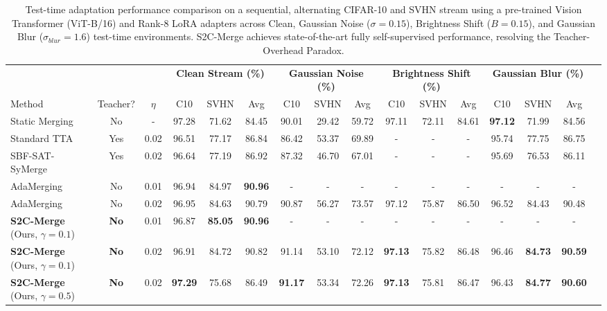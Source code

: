 \documentclass{article}
\theoremstyle{plain}
\theoremstyle{definition}
\theoremstyle{remark}
\begin{document}
\begin{table}[t]
\caption{Test-time adaptation performance comparison on a sequential, alternating CIFAR-10 and SVHN stream using a pre-trained Vision Transformer (ViT-B/16) and Rank-8 LoRA adapters across Clean, Gaussian Noise ($\sigma=0.15$), Brightness Shift ($B=0.15$), and Gaussian Blur ($\sigma_{blur}=1.6$) test-time environments. S2C-Merge achieves state-of-the-art fully self-supervised performance, resolving the Teacher-Overhead Paradox.}
\label{tab:results}
\vskip 0.05in
\centering
\begin{footnotesize}
\begin{sc}
\setlength{\tabcolsep}{1.2pt}
\begin{tabular}{lccccccccccccccc}
\toprule
& & & \multicolumn{3}{c}{\textbf{Clean Stream (\%)}} & \multicolumn{3}{c}{\textbf{Gaussian Noise (\%)}} & \multicolumn{3}{c}{\textbf{Brightness Shift (\%)}} & \multicolumn{3}{c}{\textbf{Gaussian Blur (\%)}} \\
\cmidrule(r){4-6} \cmidrule(r){7-9} \cmidrule(r){10-12} \cmidrule(r){13-15}
Method & Teacher? & $\eta$ & C10 & SVHN & Avg & C10 & SVHN & Avg & C10 & SVHN & Avg & C10 & SVHN & Avg \\
\midrule
Static Merging & No & - & 97.28 & 71.62 & 84.45 & 90.01 & 29.42 & 59.72 & 97.11 & 72.11 & 84.61 & \textbf{97.12} & 71.99 & 84.56 \\
Standard TTA & Yes & 0.02 & 96.51 & 77.17 & 86.84 & 86.42 & 53.37 & 69.89 & - & - & - & 95.74 & 77.75 & 86.75 \\
SBF-SAT-SyMerge & Yes & 0.02 & 96.64 & 77.19 & 86.92 & 87.32 & 46.70 & 67.01 & - & - & - & 95.69 & 76.53 & 86.11 \\
\midrule
AdaMerging & No & 0.01 & 96.94 & 84.97 & \textbf{90.96} & - & - & - & - & - & - & - & - & - \\
AdaMerging & No & 0.02 & 96.95 & 84.63 & 90.79 & 90.87 & 56.27 & 73.57 & 97.12 & 75.87 & 86.50 & 96.52 & 84.43 & 90.48 \\
\midrule
\textbf{S2C-Merge} (Ours, $\gamma{=}0.1$) & \textbf{No} & 0.01 & 96.87 & \textbf{85.05} & \textbf{90.96} & - & - & - & - & - & - & - & - & - \\
\textbf{S2C-Merge} (Ours, $\gamma{=}0.1$) & \textbf{No} & 0.02 & 96.91 & 84.72 & 90.82 & 91.14 & 53.10 & 72.12 & \textbf{97.13} & 75.82 & 86.48 & 96.46 & \textbf{84.73} & \textbf{90.59} \\
\textbf{S2C-Merge} (Ours, $\gamma{=}0.5$) & \textbf{No} & 0.02 & \textbf{97.29} & 75.68 & 86.49 & \textbf{91.17} & 53.34 & 72.26 & \textbf{97.13} & 75.81 & 86.47 & 96.43 & \textbf{84.77} & \textbf{90.60} \\

\end{tabular}
\end{sc}
\end{footnotesize}
\end{table}
\end{document}
